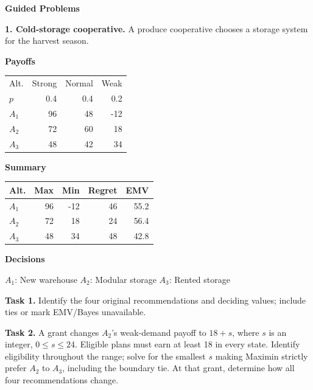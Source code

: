 \begin{studentproblem}
\textbf{Guided Problems}\par\smallskip
\textbf{1. Cold-storage cooperative.} A produce cooperative chooses a storage system for the harvest season.




\begin{center}
	\begingroup
	\normalsize
	\setlength{\tabcolsep}{2.5pt}
	\renewcommand{\arraystretch}{1.1}
	
	\begin{minipage}[t]{0.31\linewidth}
		\centering
		\textbf{Payoffs}\par\vspace{2pt}
		\begin{tabular}{@{}lrrr@{}}
			\toprule
			Alt. & Strong & Normal & Weak\\
			$p$ & 0.4 & 0.4 & 0.2\\
			\midrule
			$A_1$ & 96 & 48 & -12\\
			$A_2$ & 72 & 60 & 18\\
			$A_3$ & 48 & 42 & 34\\
			\bottomrule
		\end{tabular}
	\end{minipage}%
	\hfill
	\begin{minipage}[t]{0.33\linewidth}
		\centering
		\textbf{Summary}\par\vspace{2pt}
		\begin{tabular}{@{}lrrrr@{}}
			\toprule
			Alt. & Max & Min & Regret & EMV\\
			\midrule
			$A_1$ & 96 & -12 & 46 & 55.2\\
			$A_2$ & 72 & 18 & 24 & 56.4\\
			$A_3$ & 48 & 34 & 48 & 42.8\\
			\bottomrule
		\end{tabular}
	\end{minipage}%
	\hfill
	\begin{minipage}[t]{0.32\linewidth}
		\centering
		\textbf{Decisions}\par\vspace{2pt}
		\choices
	\end{minipage}
	
	\vspace{2mm}
	\footnotesize
	$A_1$: New warehouse \quad
	$A_2$: Modular storage \quad
	$A_3$: Rented storage
	\endgroup
\end{center}




\textbf{Task 1.} Identify the four original recommendations and deciding values; include ties or mark EMV/Bayes unavailable.

\textbf{Task 2.} A grant changes $A_2$'s weak-demand payoff to $18+s$, where $s$ is an integer, $0\leq s\leq24$. Eligible plans must earn at least 18 in every state. Identify eligibility throughout the range; solve for the smallest $s$ making Maximin strictly prefer $A_2$ to $A_3$, including the boundary tie. At that grant, determine how all four recommendations change.
\tasktwobox
\end{studentproblem}

